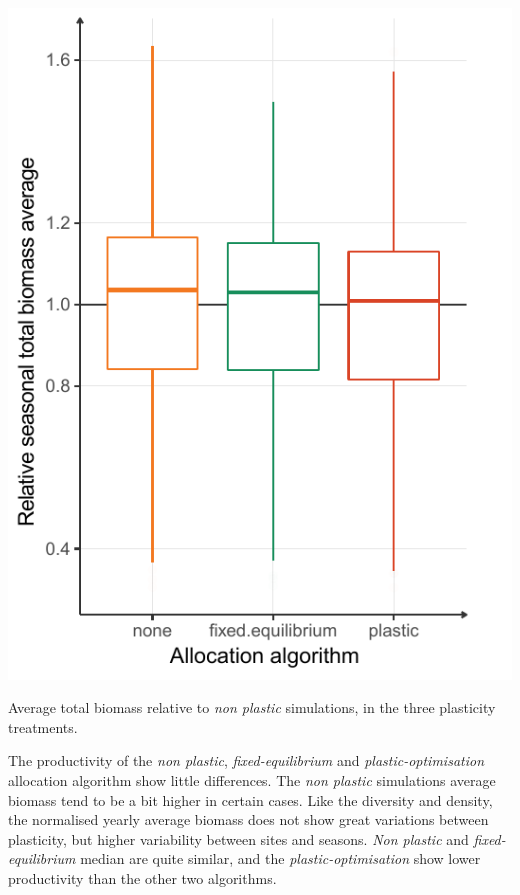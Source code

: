 \begin{marginfigure}\label{fig:total_BM_comm}
\includegraphics[width = \textwidth]{./2_PP/Figures/Comm/comm_BMtot_differences.pdf}
\caption[Average total biomass in plasticity treatments]{Average total biomass relative to \textit{non plastic} simulations, in the three plasticity treatments.}
\end{marginfigure}

The productivity of the \textit{non plastic}, \textit{fixed-equilibrium} and \textit{plastic-optimisation} allocation algorithm show little differences. The \textit{non plastic} simulations average biomass tend to be a bit higher in certain cases. Like the diversity and density, the normalised yearly average biomass does not show great variations between plasticity, but higher variability between sites and seasons. \textit{Non plastic} and \textit{fixed-equilibrium} median are quite similar, and the \textit{plastic-optimisation} show lower productivity than the other two algorithms.

